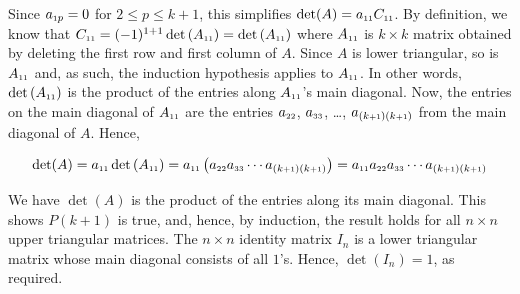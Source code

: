 \documentclass{ximera}
\begin{document}
\begin{enumerate}
Since $a_{\mbox{\tiny$1$}p} = 0$ for $2 \leq p \leq k+1$, this simplifies $\det(A) = a_{\mbox{\tiny$11$}}C_{\mbox{\tiny$11$}}$.  By definition, we know that $C_{\mbox{\tiny$11$}} = (-1)^{1+1} \det\left(A_{\mbox{\tiny$11$}}\right) =\det\left(A_{\mbox{\tiny$11$}}\right)$ where $A_{\mbox{\tiny$11$}}$ is $k \times k$  matrix obtained by deleting the first row and first column of $A$. Since $A$ is lower triangular, so is $A_{\mbox{\tiny$11$}}$ and, as such, the induction hypothesis applies to $A_{\mbox{\tiny$11$}}$. In other words, $\det\left(A_{\mbox{\tiny$11$}}\right)$ is the product of the entries along $A_{\mbox{\tiny$11$}}$'s main diagonal.  Now, the entries on the main diagonal of $A_{\mbox{\tiny$11$}}$ are the entries $a_{\mbox{\tiny$22$}}$, $a_{\mbox{\tiny$33$}}$, \ldots, $a_{(k\mbox{\tiny$+1$})(k\mbox{\tiny$+1$})}$ from the main diagonal of $A$.  Hence,

\[ \det(A) = a_{\mbox{\tiny$11$}} \det\left(A_{\mbox{\tiny$11$}}\right) = a_{\mbox{\tiny$11$}} \left(a_{\mbox{\tiny$22$}}a_{\mbox{\tiny$33$}} \cdots a_{(k\mbox{\tiny$+1$})(k\mbox{\tiny$+1$})} \right) = a_{\mbox{\tiny$11$}} a_{\mbox{\tiny$22$}}a_{\mbox{\tiny$33$}} \cdots a_{(k\mbox{\tiny$+1$})(k\mbox{\tiny$+1$})}\]

We have $\det(A)$ is the product of the entries along its main diagonal.  This shows $P(k+1)$ is true, and, hence, by induction, the result holds for all $n \times n$ upper triangular matrices. The $n \times n$ identity matrix $I_{n}$ is a lower triangular matrix whose main diagonal consists of all $1$'s.  Hence,  $\det\left(I_{n}\right) = 1$, as required.

\end{enumerate}
\end{document}
